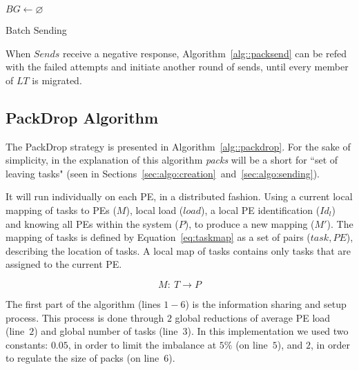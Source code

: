 \begin{algorithm}[!ht]
    \DontPrintSemicolon
    $BG \gets \varnothing$ \\
    \caption{Batch Sending}  
    \label{alg::packsend}
\end{algorithm}

When $Sends$ receive a negative response, Algorithm~\ref{alg::packsend} can be refed with the failed attempts and initiate another round of sends, until every member of $LT$ is migrated.

\subsection{PackDrop Algorithm} \label{sec:algo:main}

The PackDrop strategy is presented in Algorithm~\ref{alg::packdrop}.
For the sake of simplicity, in the explanation of this algorithm \textit{packs} will be a short for ``set of leaving tasks" (seen in Sections~\ref{sec:algo:creation}~and~\ref{sec:algo:sending}).

It will run individually on each PE, in a distributed fashion. 
Using a current local mapping of tasks to PEs ($M$), local load ($load$), a local PE identification ($Id_l$) and knowing all PEs within the system ($P$), to produce a new mapping ($M'$).
The mapping of tasks is defined by Equation~\ref{eq:taskmap} as a set of pairs ($task, PE$), describing the location of tasks.
A local map of tasks contains only tasks that are assigned to the current PE.

\begin{equation}
	M:\ T \rightarrow P
	\label{eq:taskmap}
\end{equation}

The first part of the algorithm (lines $1-6$) is the information sharing and setup process. 
This process is done through $2$ global reductions of average PE load (line~$2$) and global number of tasks (line~$3$).
In this implementation we used two constants: $0.05$, in order to limit the imbalance at $5\%$ (on line~$5$), and $2$, in order to regulate the size of packs (on line~$6$).

